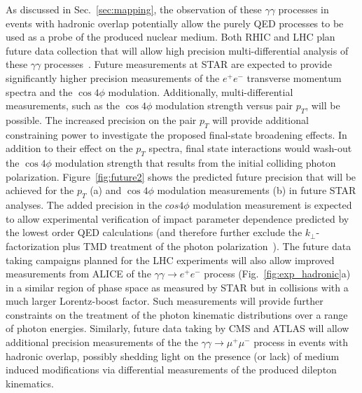 \documentclass[twocolumn,epjc3]{svjour3}\sloppy
\begin{document}
As discussed in Sec.~\ref{sec:mapping}, the observation of these $\gamma\gamma$ processes in events with hadronic overlap potentially allow the purely QED processes to be used as a probe of the produced nuclear medium. Both RHIC and LHC plan future data collection that will allow high precision multi-differential analysis of these $\gamma\gamma$ processes~\cite{SN0755STARBeam,ProspectsMeasurementsPhotonInduced}. Future measurements at STAR are expected to provide significantly higher precision measurements of the $e^+e^-$ transverse momentum spectra and the $\cos4\phi$ modulation. Additionally, multi-differential measurements, such as the $\cos4\phi$ modulation strength versus pair $p_T$, will be possible. The increased precision on the pair $p_T$ will provide additional constraining power to investigate the proposed final-state broadening effects. In addition to their effect on the $p_T$ spectra, final state interactions would wash-out the $\cos4\phi$ modulation strength that results from the initial colliding photon polarization. Figure~\ref{fig:future2} shows the predicted future precision that will be achieved for the $p_T$ (a) and $\cos4\phi$ modulation measurements (b) in future STAR analyses. The added precision in the $cos4\phi$ modulation measurement is expected to allow experimental verification of impact parameter dependence predicted by the lowest order QED calculations (and therefore further exclude the $k_\perp$-factorization plus TMD treatment of the photon polarization~\cite{li_probing_2019,SuperChic3}). The future data taking campaigns planned for the LHC experiments will also allow improved measurements from ALICE of the $\gamma\gamma \rightarrow e^+e^-$ process (Fig.~\ref{fig:exp_hadronic}a) in a similar region of phase space as measured by STAR but in collisions with a much larger Lorentz-boost factor. Such measurements will provide further constraints on the treatment of the photon kinematic distributions over a range of photon energies. Similarly, future data taking by CMS and ATLAS will allow additional precision measurements of the the $\gamma\gamma \rightarrow \mu^+\mu^-$ process in events with hadronic overlap, possibly shedding light on the presence (or lack) of medium induced modifications via differential measurements of the produced dilepton kinematics.
\end{document}
